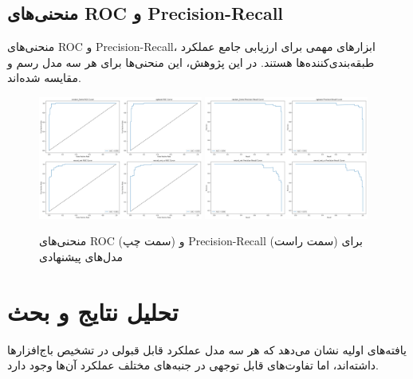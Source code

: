 \subsection{منحنی‌های ROC و Precision-Recall}
منحنی‌های ROC و Precision-Recall، ابزارهای مهمی برای ارزیابی جامع عملکرد طبقه‌بندی‌کننده‌ها هستند. در این پژوهش، این منحنی‌ها برای هر سه مدل رسم و مقایسه شده‌اند.

\begin{figure}[h]
    \centering
    \includegraphics[width=0.48\textwidth]{images/roc_curves.png}
    \includegraphics[width=0.48\textwidth]{images/pr_curves.png}
    \caption{منحنی‌های ROC (سمت چپ) و Precision-Recall (سمت راست) برای مدل‌های پیشنهادی}
\end{figure}

\section{تحلیل نتایج و بحث}
یافته‌های اولیه نشان می‌دهد که هر سه مدل عملکرد قابل قبولی در تشخیص باج‌افزارها داشته‌اند، اما تفاوت‌های قابل توجهی در جنبه‌های مختلف عملکرد آن‌ها وجود دارد.

